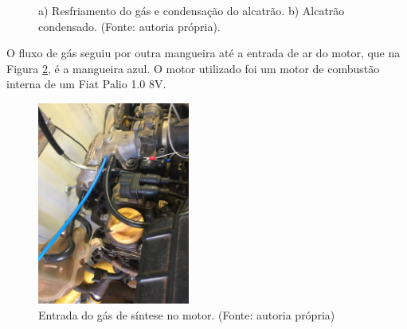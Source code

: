 \begin{figure}[!htb]
	\centering
	\quad %
	\caption{a) Resfriamento do gás e condensação do alcatrão. b) Alcatrão condensado. (Fonte: autoria própria).}
	\label{sistema_limpeza}
\end{figure}

O fluxo de gás seguiu por outra mangueira até a entrada de ar do motor, que na Figura \ref{entrada_gas}, é a mangueira azul. O motor utilizado foi um motor de combustão interna de um Fiat Palio 1.0 8V.

\begin{figure}[!htb]
	\centering
	\includegraphics[width = 5cm]{Figuras/entrada_gas}
	\caption{Entrada do gás de síntese no motor. (Fonte: autoria própria)}
	\label{entrada_gas}
\end{figure}

